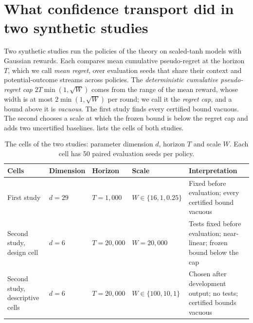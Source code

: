 \section{What confidence transport did in two synthetic studies}
\label{sec:transport-followup}

Two synthetic studies run the policies of the theory on scaled-tanh models
with Gaussian rewards. Each compares mean cumulative pseudo-regret at the
horizon $T$, which we call \emph{mean regret}, over evaluation seeds that share
their context and potential-outcome streams across policies. The
\emph{deterministic cumulative pseudo-regret cap} $2T\min(1,\sqrt W)$ comes
from the range of the mean reward, whose width is at most $2\min(1,\sqrt W)$
per round; we call it the \emph{regret cap}, and a bound above it is
\emph{vacuous}. The first study finds every certified bound vacuous. The second chooses a scale at which the frozen
bound is below the regret cap and adds two uncertified baselines.
 lists the cells of both studies.

\begin{table}[H]
\centering
\caption{The cells of the two studies: parameter dimension $d$, horizon $T$ and
scale $W$. Each cell has 50 paired evaluation seeds per policy.}
\label{tab:transport-study-design}
\begin{tabularx}{\linewidth}{@{}>{\raggedright\arraybackslash}p{.17\linewidth}lll>{\raggedright\arraybackslash}X@{}}
\toprule
Cells & Dimension & Horizon & Scale & Interpretation \\
\midrule
First study & $d=29$ & $T=1{,}000$ & $W\in\{16,1,0.25\}$ & Fixed before evaluation; every certified bound vacuous \\
Second study, design cell & $d=6$ & $T=20{,}000$ & $W=20{,}000$ & Tests fixed before evaluation; near-linear; frozen bound below the cap \\
Second study, descriptive cells & $d=6$ & $T=20{,}000$ & $W\in\{100,10,1\}$ & Chosen after development output; no tests; certified bounds vacuous \\
\bottomrule
\end{tabularx}
\end{table}

